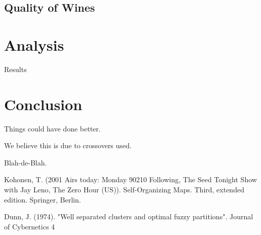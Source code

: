 \documentclass[journal]{IEEEtran}
\begin{document}
  \subsection{Quality of Wines}
    
  
\section{Analysis}
Results

\section{Conclusion}
Things could have done better.

We believe this is due to crossovers used.

Blah-de-Blah.




%
%
\begin{thebibliography}{1}

Kohonen, T. (2001
Airs today: Monday
     90210
     Following, The
     Seed
     Tonight Show with Jay Leno, The
     Zero Hour (US)). Self-Organizing Maps. Third, extended edition. Springer, Berlin.

Dunn, J. (1974). "Well separated clusters and optimal fuzzy partitions". Journal of Cybernetics 4

\end{thebibliography}






\end{document}
